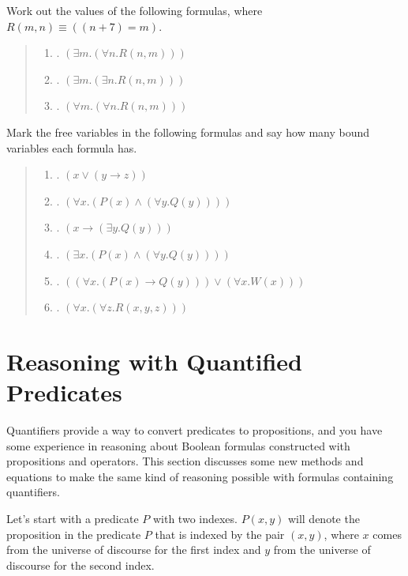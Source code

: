{{\begin{ExerciseList}
\Exercise Work out the values of the following formulas,
where $R(m, n) \equiv ((n + 7) = m)$.
\begin{quote}
\begin{enumerate}[label=\alph*]
\item. $(\exists m.(\forall n.R(n,m)))$
\item. $(\exists m.(\exists n.R(n,m)))$
\item. $(\forall m.(\forall n.R(n,m)))$
\end{enumerate}
\end{quote}

\Exercise
Mark the
free
variables in the following formulas and say how many bound variables
each formula has.
\begin{quote}
\begin{enumerate}[label=\alph*]
\item. $(x \vee (y \rightarrow z))$
\item. $(\forall x.(P(x) \wedge (\forall y.Q(y))))$
\item. $(x \rightarrow (\exists y.Q(y)))$
\item. $(\exists x.(P(x) \wedge (\forall y.Q(y))))$
\item. $((\forall x.(P(x) \rightarrow Q(y))) \vee (\forall x.W(x)))$
\item. $(\forall x. (\forall z.R(x, y, z)))$
\end{enumerate}
\end{quote}

\end{ExerciseList}

\section{Reasoning with Quantified Predicates}
\label{sec:quantifier-equations}

Quantifiers provide a way to convert predicates to propositions,
and you have some experience in reasoning about Boolean formulas constructed with
propositions and operators.
This section discusses some new methods and equations to make
the same kind of reasoning possible with formulas containing quantifiers.

Let's start with a predicate $P$ with two indexes.
$P(x,y)$ will denote the proposition in the predicate $P$ that is indexed
by the pair $(x,y)$, where $x$ comes from the universe of discourse for the first index
and $y$ from the universe of discourse for the second index.

}}
